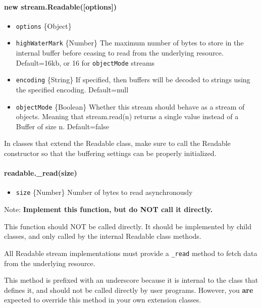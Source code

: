 \paragraph{new
stream.Readable({[}options{]})}\label{new-stream.readableoptions}

\begin{itemize}
\itemsep1pt\parskip0pt
\item
  \texttt{options} \{Object\}
\item
  \texttt{highWaterMark} \{Number\} The maximum number of bytes to store
  in the internal buffer before ceasing to read from the underlying
  resource. Default=16kb, or 16 for \texttt{objectMode} streams
\item
  \texttt{encoding} \{String\} If specified, then buffers will be
  decoded to strings using the specified encoding. Default=null
\item
  \texttt{objectMode} \{Boolean\} Whether this stream should behave as a
  stream of objects. Meaning that stream.read(n) returns a single value
  instead of a Buffer of size n. Default=false
\end{itemize}

In classes that extend the Readable class, make sure to call the
Readable constructor so that the buffering settings can be properly
initialized.

\paragraph{readable.\_read(size)}\label{readable.ux5freadsize}

\begin{itemize}
\itemsep1pt\parskip0pt
\item
  \texttt{size} \{Number\} Number of bytes to read asynchronously
\end{itemize}

Note: \textbf{Implement this function, but do NOT call it directly.}

This function should NOT be called directly. It should be implemented by
child classes, and only called by the internal Readable class methods.

All Readable stream implementations must provide a \texttt{\_read}
method to fetch data from the underlying resource.

This method is prefixed with an underscore because it is internal to the
class that defines it, and should not be called directly by user
programs. However, you \textbf{are} expected to override this method in
your own extension classes.

